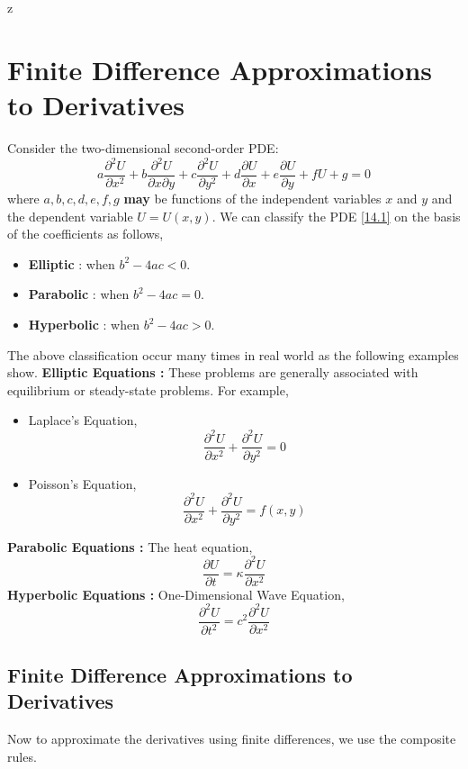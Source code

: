 z\documentclass[a4paper,12pt,twoside]{book}
\newcommand{\nll}[0]{\newline\newline}
\newcommand{\pder}[2]{\frac{\partial #1}{\partial #2}}
\begin{document}
\chapter{Finite Difference Approximations to Derivatives}
Consider the two-dimensional second-order PDE:
\begin{equation}
\label{14.1}
    a\pder{^2U}{x^2} + b\pder{^2 U}{x\partial y} + c\pder{^2 U }{y^2} + d\pder{U}{x} + e\pder{U}{y} + fU + g = 0
\end{equation}
where $a,b,c,d,e,f,g$ \textbf{may} be functions of the independent variables $x$ and $y$ and the dependent variable $U = U(x,y)$.
\nll
We can classify the PDE \ref{14.1} on the basis of the coefficients as follows,
\begin{itemize}
    \item {\textbf{Elliptic} : when $b^2 - 4ac < 0$.}
    \item{\textbf{Parabolic} : when $b^2 - 4ac = 0$.}
    \item{\textbf{Hyperbolic} : when $b^2 - 4ac > 0$.}
\end{itemize}
The above classification occur many times in real world as the following examples show.
\nll
\textbf{Elliptic Equations : }These problems are generally associated with equilibrium or steady-state problems. For example,
\begin{itemize}
    \item {Laplace's Equation,
    \[\pder{^2 U}{x^2} + \pder{^2 U}{y^2} = 0\]}
    \item{Poisson's Equation,
    \[ \pder{^2 U}{x^2} + \pder{^2 U}{y^2} = f(x,y) \]
    }
\end{itemize}
\textbf{Parabolic Equations : } The heat equation,
\[ \pder{U}{t} = \kappa \pder{^2 U}{x^2} \]
\textbf{Hyperbolic Equations : }One-Dimensional Wave Equation,
\[  \pder{^2 U}{t^2} = c^2 \pder{^2 U }{x^2}\]
\section{Finite Difference Approximations to Derivatives}
Now to approximate the derivatives using finite differences, we use the composite rules.
\end{document}
